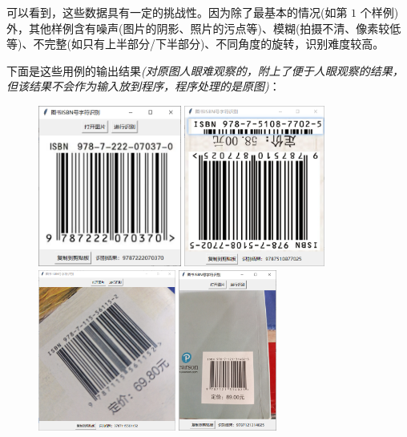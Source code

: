\documentclass{ctexart}
\begin{document}
可以看到，这些数据具有一定的挑战性。因为除了最基本的情况(如第 $1$ 个样例)外，其他样例含有噪声(图片的阴影、照片的污点等)、模糊(拍摄不清、像素较低等)、不完整(如只有上半部分/下半部分)、不同角度的旋转，识别难度较高。

下面是这些用例的输出结果\textit{(对原图人眼难观察的，附上了便于人眼观察的结果，但该结果不会作为输入放到程序，程序处理的是原图)}：

\begin{figure}[H]
    \centering
    \includegraphics[height=150pt]{test_01}\quad
    \includegraphics[height=150pt]{test_02}\\
    \includegraphics[height=150pt]{test_03}\quad
    \includegraphics[height=150pt]{test_04}\\

\end{figure}
\end{document}
